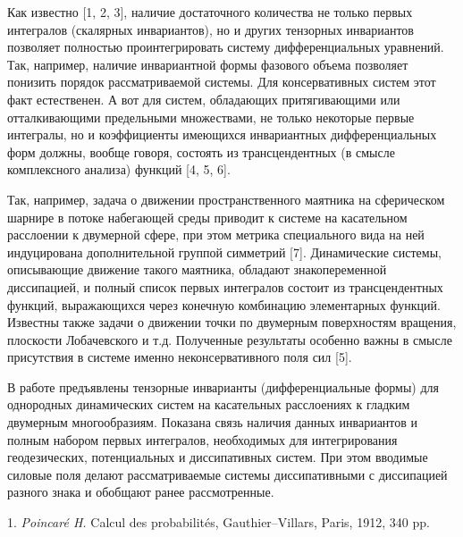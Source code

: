\documentclass{vzmsthesis}
\begin{document}

\vzmscaption



Как известно [1, 2, 3], наличие достаточного количества не только первых интегралов (скалярных инвариантов), но и других тензорных инвариантов позволяет полностью проинтегрировать систему дифференциальных уравнений. Так, например, наличие инвариантной формы фазового объема позволяет понизить порядок рассматриваемой системы. Для консервативных систем этот факт естественен. А вот для систем, обладающих притягивающими или отталкивающими предельными множествами, не только некоторые первые интегралы, но и коэффициенты имеющихся инвариантных дифференциальных форм должны, вообще говоря, состоять из трансцендентных (в смысле комплексного анализа) функций [4, 5, 6]. 

Так, например, задача о движении пространственного маятника на сферическом шарнире в потоке набегающей среды приводит к системе на касательном расслоении к двумерной сфере, при этом метрика специального вида на ней индуцирована дополнительной группой симметрий [7]. Динамические системы, описывающие движение такого маятника, обладают знакопеременной диссипацией, и полный список первых интегралов состоит из трансцендентных функций, выражающихся через конечную комбинацию элементарных функций. Известны также задачи о движении точки по двумерным поверхностям вращения, плоскости Лобачевского и т.д. Полученные результаты особенно важны в смысле присутствия в системе именно неконсервативного поля сил [5].

В работе предъявлены тензорные инварианты (дифференциальные формы) для однородных динамических систем на касательных расслоениях к гладким двумерным многообразиям. Показана связь наличия данных инвариантов и полным набором первых интегралов, необходимых для интегрирования геодезических, потенциальных и диссипативных систем. При этом вводимые силовые поля делают рассматриваемые системы диссипативными с диссипацией разного знака и обобщают ранее рассмотренные. 


\litlist

1. {\it Poincar\'{e} H.} Calcul des probabilit\'{e}s, Gauthier--Villars, Paris, 1912, 340 pp. 
\end{document}

